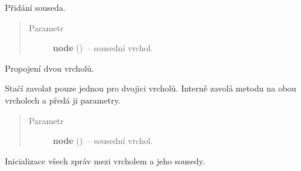 \begin{fulllineitems}
\begin{fulllineitems}
\end{fulllineitems}


\begin{fulllineitems}
\label{alex.infer:alex.infer.factor.alex.infer.node.DirichletParameterNode.add_neighbor}
Přidání souseda.
\begin{quote}\begin{description}
\item[{Parametr}] \leavevmode
\textbf{node} ({\hyperref[alex.infer:alex.infer.factor.alex.infer.node.DirichletFactorNode]{}})~-- sousední vrchol.

\end{description}\end{quote}

\end{fulllineitems}


\begin{fulllineitems}
\label{alex.infer:alex.infer.factor.alex.infer.node.DirichletParameterNode.connect}
Propojení dvou vrcholů.

Stačí zavolat pouze jednou pro dvojici vrcholů.
Interně zavolá metodu {\hyperref[alex.infer:alex.infer.factor.alex.infer.node.DirichletParameterNode.add_neighbor]{}} na obou vrcholech a předá ji parametry.
\begin{quote}\begin{description}
\item[{Parametr}] \leavevmode
\textbf{node} ({\hyperref[alex.infer:alex.infer.factor.alex.infer.node.DirichletFactorNode]{}})~-- sousední vrchol.

\end{description}\end{quote}

\end{fulllineitems}


\begin{fulllineitems}
\label{alex.infer:alex.infer.factor.alex.infer.node.DirichletParameterNode.init_messages}
Inicializace všech zpráv mezi vrcholem a jeho sousedy.


\end{fulllineitems}
\end{fulllineitems}
